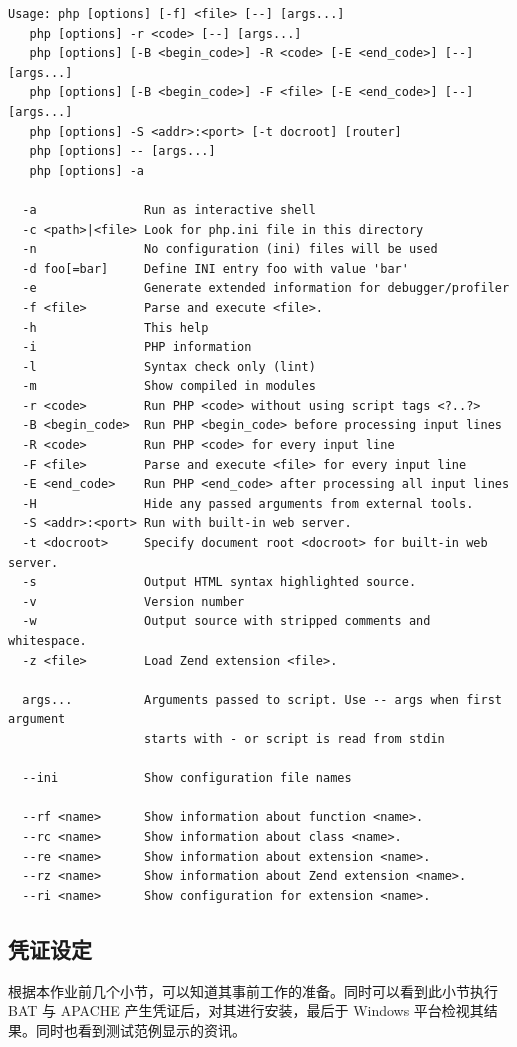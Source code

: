 \begin{Verbatim}
Usage: php [options] [-f] <file> [--] [args...]
   php [options] -r <code> [--] [args...]
   php [options] [-B <begin_code>] -R <code> [-E <end_code>] [--] [args...]
   php [options] [-B <begin_code>] -F <file> [-E <end_code>] [--] [args...]
   php [options] -S <addr>:<port> [-t docroot] [router]
   php [options] -- [args...]
   php [options] -a

  -a               Run as interactive shell
  -c <path>|<file> Look for php.ini file in this directory
  -n               No configuration (ini) files will be used
  -d foo[=bar]     Define INI entry foo with value 'bar'
  -e               Generate extended information for debugger/profiler
  -f <file>        Parse and execute <file>.
  -h               This help
  -i               PHP information
  -l               Syntax check only (lint)
  -m               Show compiled in modules
  -r <code>        Run PHP <code> without using script tags <?..?>
  -B <begin_code>  Run PHP <begin_code> before processing input lines
  -R <code>        Run PHP <code> for every input line
  -F <file>        Parse and execute <file> for every input line
  -E <end_code>    Run PHP <end_code> after processing all input lines
  -H               Hide any passed arguments from external tools.
  -S <addr>:<port> Run with built-in web server.
  -t <docroot>     Specify document root <docroot> for built-in web server.
  -s               Output HTML syntax highlighted source.
  -v               Version number
  -w               Output source with stripped comments and whitespace.
  -z <file>        Load Zend extension <file>.

  args...          Arguments passed to script. Use -- args when first argument
                   starts with - or script is read from stdin

  --ini            Show configuration file names

  --rf <name>      Show information about function <name>.
  --rc <name>      Show information about class <name>.
  --re <name>      Show information about extension <name>.
  --rz <name>      Show information about Zend extension <name>.
  --ri <name>      Show configuration for extension <name>.
\end{Verbatim}

\subsection{凭证设定}

根据本作业前几个小节，可以知道其事前工作的准备。同时可以看到此小节执行 BAT 与 APACHE 产生凭证后，对其进行安装，最后于 Windows 平台检视其结果。同时也看到测试范例显示的资讯。


